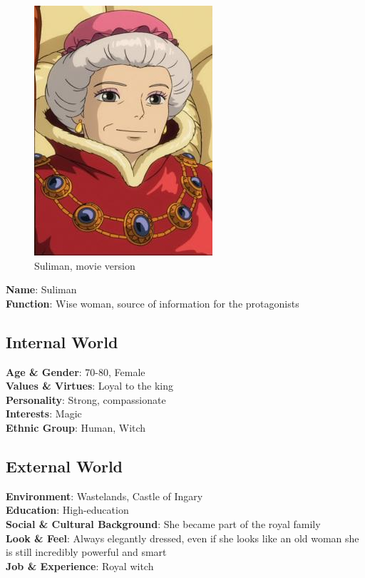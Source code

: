 \begin{figure}[H]
 \includegraphics{Images/Characters/suliman}
 \caption{Suliman, movie version}
\end{figure}

\textbf{Name}: Suliman\\
\textbf{Function}: Wise woman, source of information for the protagonists

\subsection{Internal World}

\textbf{Age \& Gender}: 70-80, Female \\
\textbf{Values \& Virtues}: Loyal to the king \\
\textbf{Personality}: Strong, compassionate\\
\textbf{Interests}: Magic \\
\textbf{Ethnic Group}: Human, Witch

\subsection{External World}
\textbf{Environment}: Wastelands, Castle of Ingary \\
\textbf{Education}: High-education \\
\textbf{Social \& Cultural Background}: She became part of the royal family \\
\textbf{Look \& Feel}: Always elegantly dressed, even if she looks like an old woman she is still incredibly powerful and smart \\
\textbf{Job \& Experience}: Royal witch\\

